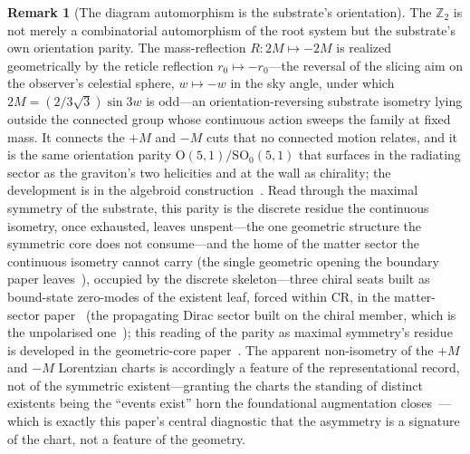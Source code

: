 \documentclass[11pt,a4paper]{article}
\theoremstyle{definition}
\newtheorem{remark}[theorem]{Remark}
\begin{document}
\begin{remark}[The diagram automorphism is the substrate's orientation]\label{rem:orientation}
The $\mathbb{Z}_{2}$ is not merely a combinatorial automorphism of the root system but the substrate's own orientation parity. The mass-reflection $R:2M\mapsto-2M$ is realized geometrically by the reticle reflection $r_{0}\mapsto-r_{0}$---the reversal of the slicing aim on the observer's celestial sphere, $w\mapsto-w$ in the sky angle, under which $2M=(2/3\sqrt{3})\sin 3w$ is odd---an orientation-reversing substrate isometry lying outside the connected group whose continuous action sweeps the family at fixed mass. It connects the $+M$ and $-M$ cuts that no connected motion relates, and it is the same orientation parity $\mathrm{O}(5,1)/\mathrm{SO}_{0}(5,1)$ that surfaces in the radiating sector as the graviton's two helicities and at the wall as chirality; the development is in the algebroid construction~\cite{JanzenAlgebroid}. Read through the maximal symmetry of the substrate, this parity is the discrete residue the continuous isometry, once exhausted, leaves unspent---the one geometric structure the symmetric core does not consume---and the home of the matter sector the continuous isometry cannot carry (the single geometric opening the boundary paper leaves~\cite{JanzenBoundary}), occupied by the discrete skeleton---three chiral seats built as bound-state zero-modes of the existent leaf, forced within CR, in the matter-sector paper~\cite{JanzenMatter} (the propagating Dirac sector built on the chiral member, which is the unpolarised one~\cite{JanzenDynamics}); this reading of the parity as maximal symmetry's residue is developed in the geometric-core paper~\cite{JanzenGeometricCore}. The apparent non-isometry of the $+M$ and $-M$ Lorentzian charts is accordingly a feature of the representational record, not of the symmetric existent---granting the charts the standing of distinct existents being the ``events exist'' horn the foundational augmentation closes~\cite{JanzenModernParallax,JanzenCRframework}---which is exactly this paper's central diagnostic that the asymmetry is a signature of the chart, not a feature of the geometry.
\end{remark}
\end{document}
